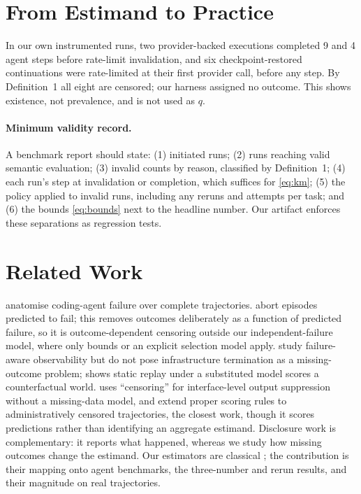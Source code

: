 \documentclass[letterpaper]{article} %
\begin{document}
\section{From Estimand to Practice}
\label{sec:practice}

In our own instrumented runs, two provider-backed executions completed 9 and 4
agent steps before rate-limit invalidation, and six checkpoint-restored
continuations were rate-limited at their first provider call, before any step. By
Definition~1 all eight are censored; our harness assigned no outcome. This shows
existence, not prevalence, and is not used as $q$.

\paragraph{Minimum validity record.} A benchmark report should state:
(1) initiated runs; (2) runs reaching valid semantic evaluation; (3) invalid
counts by reason, classified by Definition~1; (4) each run's step at
invalidation or completion, which suffices for \eqref{eq:km}; (5) the policy
applied to invalid runs, including any reruns and attempts per task; and (6) the
bounds \eqref{eq:bounds} next to the headline number. Our artifact enforces
these separations as regression tests.

\section{Related Work}

\citet{zhao2026failure} anatomise coding-agent failure over complete
trajectories. \citet{ruan2026doomed} abort episodes predicted to fail; this
removes outcomes deliberately as a function of predicted failure, so it is
outcome-dependent censoring outside our independent-failure model, where only
bounds or an explicit selection model apply. \citet{li2026early} study
failure-aware observability but do not pose infrastructure termination as a
missing-outcome problem; \citet{gonuguntla2026replay} shows static replay under
a substituted model scores a counterfactual world. \citet{wang2026interface}
uses ``censoring'' for interface-level output suppression without a
missing-data model, and \citet{raghu2026proper} extend proper scoring rules to
administratively censored trajectories, the closest work, though it scores
predictions rather than identifying an aggregate estimand. Disclosure work
\citep{kapoor2024agentsthatmatter,weidinger2025evalscience,zhu2026guardrails,chen2026judge,moghadasi2026disclose}
is complementary: it reports what happened, whereas we study how missing
outcomes change the estimand. Our estimators are classical
\citep{horvitz1952generalization,kaplan1958nonparametric,manski1990nonparametric,robins1994estimation,satten2001kaplan};
the contribution is their mapping onto agent benchmarks, the three-number and
rerun results, and their magnitude on real trajectories.
\end{document}
